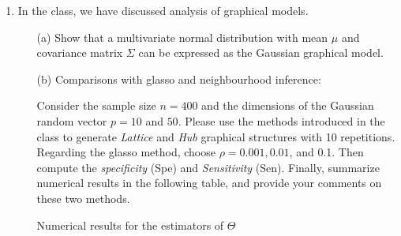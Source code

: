 \documentclass[11pt]{article}
\begin{document}
\begin{enumerate}
\begin{itemize}
\begin{table}[!ht]
\end{table}



\item[(d)] Summarize your findings for parts (b) and (c), respectively.

\end{itemize}

{\bf Note:} Let $\widehat{\beta}$ be the estimator, then $\Delta\beta$ is defined as $\Delta\beta = \widehat{\beta} - \beta$ with the $i$th component being $\widehat{\beta}_i - \beta_i$. Therefore, $\|\Delta\beta\|_1$ and $\|\Delta\beta\|_2$ are defined as
\begin{itemize}
\item $\|\Delta\beta\|_1 = \sum \limits_{i=1}^p \left| \widehat{\beta}_i - \beta_i \right|$;
\item $\|\Delta\beta\|_2 = \sqrt{ \sum \limits_{i=1}^p \left( \widehat{\beta}_i - \beta_i \right)^2 }$.
\end{itemize}


\clearpage

\item In the class, we have discussed analysis of graphical models.

\begin{itemize}

\item[(a)] Show that a multivariate normal distribution with mean $\mu$ and covariance matrix $\Sigma$ can be expressed as the Gaussian graphical model.

\item[(b)] Comparisons with glasso and neighbourhood inference:

Consider the sample size $n=400$ and the dimensions of the Gaussian random vector $p=10$ and $50$. Please use the methods introduced in the class to generate {\it Lattice} and {\it Hub} graphical structures with 10 repetitions. Regarding the glasso method, choose $\rho=0.001, 0.01$, and 0.1. Then compute the {\it specificity} (Spe) and {\it Sensitivity} (Sen). Finally, summarize numerical results in the following table, and provide your comments on these two methods.

  \begin{table}[!ht]
       \huge
     \caption{Numerical results for the estimators of $\Theta$}

\normalsize

 \centering
 

\end{table}
\end{itemize}
\end{enumerate}
\end{document}
